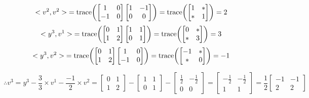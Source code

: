 \documentclass[letterpaper]{article}
\begin{document}
\begin{enumerate}
$${<v^2, v^2>} = \mathrm{trace}{\left(\begin{bmatrix}1 & 0 \\ -1 & 0 \end{bmatrix} \begin{bmatrix}1 & -1 \\ 0 & 0 \end{bmatrix}\right)} = \mathrm{trace}{\left(\begin{bmatrix}1 & * \\ * & 1 \end{bmatrix}\right)}= 2$$
$${<y^3, v^1>} = \mathrm{trace}{\left(\begin{bmatrix}0 & 1 \\ 1 & 2 \end{bmatrix} \begin{bmatrix}1 & 1 \\ 0 & 1 \end{bmatrix}\right)} = \mathrm{trace}{\left(\begin{bmatrix}0 & * \\ * & 3 \end{bmatrix}\right)}= 3$$
$${<y^3, v^2>} = \mathrm{trace}{\left(\begin{bmatrix}0 & 1 \\ 1 & 2 \end{bmatrix} \begin{bmatrix}1 & 0 \\ -1 & 0 \end{bmatrix}\right)} = \mathrm{trace}{\left(\begin{bmatrix}-1 & * \\ * & 0 \end{bmatrix}\right)}= -1$$

$$\therefore v^3 = y^3 - \dfrac{3}{3} \times v^1 - \dfrac{-1}{2} \times v^2 = \begin{bmatrix}0 & 1 \\ 1 & 2 \end{bmatrix}- \begin{bmatrix}1 & 1 \\ 0 & 1 \end{bmatrix} - \begin{bmatrix} \frac{1}{2} & -\frac{1}{2} \\ 0  & 0  \end{bmatrix}=  \begin{bmatrix} -\frac{1}{2} & -\frac{1}{2} \\ 1  & 1  \end{bmatrix}=\frac{1}{2}  \begin{bmatrix} -1 & -1 \\ 2  & 2  \end{bmatrix}$$\\




\end{enumerate}
\end{document}
